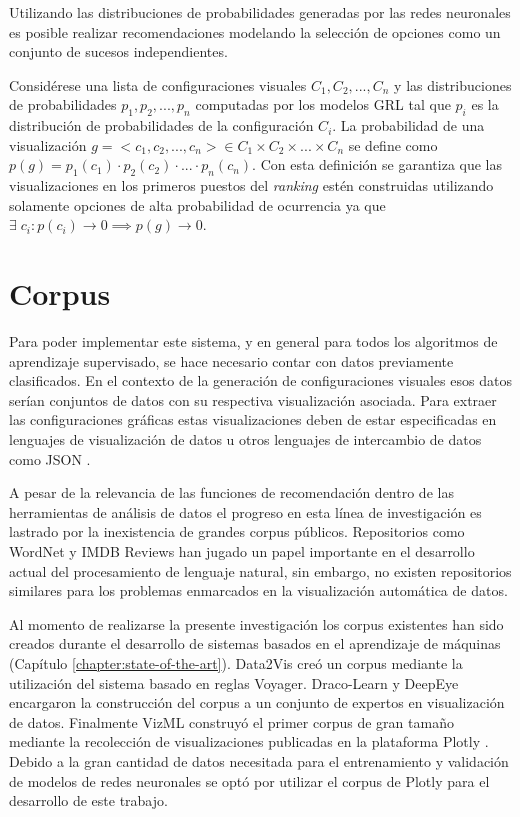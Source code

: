 Utilizando las distribuciones de probabilidades generadas por las redes neuronales es posible realizar
recomendaciones modelando la selecci\'on de opciones como un conjunto de sucesos independientes.

Consid\'erese una lista de configuraciones visuales $C_1, C_2, ..., C_n$ y las distribuciones de probabilidades 
$p_1, p_2, ..., p_n$ computadas por los modelos GRL tal que $p_i$ es la distribuci\'on de probabilidades
de la configuraci\'on $C_i$.
La probabilidad de una visualizaci\'on $g = <c_1, c_2, ..., c_n> \in C_1 \times C_2 \times ... \times C_n$
se define como $p(g) = p_1(c_1) \cdot p_2(c_2) \cdot ... \cdot p_n(c_n)$.
Con esta definici\'on se garantiza que las visualizaciones en los primeros puestos del \textit{ranking} 
est\'en construidas utilizando solamente opciones de alta probabilidad 
de ocurrencia ya que $\exists \; c_i : p(c_i) \to 0 \implies p(g) \to 0$.


\section{Corpus}

Para poder implementar este sistema, y en general
para todos los algoritmos de aprendizaje supervisado, se hace necesario contar con datos previamente clasificados.
En el contexto de la generaci\'on de configuraciones visuales esos datos ser\'ian conjuntos
de datos con su respectiva visualizaci\'on asociada. Para extraer las configuraciones gr\'aficas 
estas visualizaciones deben de estar especificadas en lenguajes de visualizaci\'on de datos u otros lenguajes
de intercambio de datos como JSON \cite{pezoa2016foundations}.

A pesar de la relevancia de las funciones de recomendaci\'on dentro
de las herramientas de an\'alisis de datos el progreso en esta l\'inea
de investigaci\'on es lastrado por la inexistencia de grandes corpus p\'ublicos.
Repositorios como WordNet \cite{wordnet1998} y IMDB Reviews \cite{maas-EtAl:2011:ACL-HLT2011} han jugado un papel importante en el desarrollo actual
del procesamiento de lenguaje natural, sin embargo, no existen repositorios similares para
los problemas enmarcados en la visualizaci\'on autom\'atica de datos.

Al momento de realizarse la presente investigaci\'on los corpus existentes
han sido creados durante el desarrollo de sistemas basados en el aprendizaje de m\'aquinas (Cap\'itulo \ref{chapter:state-of-the-art}).
Data2Vis cre\'o un corpus mediante la utilizaci\'on del sistema basado en reglas Voyager. Draco-Learn y DeepEye encargaron
la construcci\'on del corpus a un conjunto de expertos en visualizaci\'on de datos. Finalmente VizML construy\'o el primer corpus
de gran tama\~no mediante la recolecci\'on de visualizaciones publicadas en la plataforma Plotly \cite{plotly}. Debido a la gran cantidad
de datos necesitada para el entrenamiento y validaci\'on de modelos de redes neuronales se opt\'o por utilizar el corpus de Plotly para el desarrollo de
este trabajo. 

